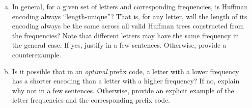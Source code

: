 \documentclass[11pt]{article}
\begin{document}
    \begin{tcolorbox}[title={Problem 4 (Huffman Encoding, Short Answers, 15 points)}] \setlength\parindent{1em}
        \begin{enumerate}[(a)]
        \item In general, for a given set of letters and corresponding frequencies, is Huffman encoding always ``length-unique''? That is, for any letter, will the length of its encoding always be the same across all valid Huffman trees constructed from the frequencies? Note that different letters may have the same frequency in the general case. If yes, justify in a few sentences. Otherwise, provide a counterexample.
        \item Is it possible that in an \emph{optimal} prefix code, a letter with a lower frequency has a shorter encoding than a
        letter with a higher frequency? If no, explain why not in a few sentences. Otherwise, provide an explicit example of the letter frequencies and the corresponding prefix code.
        \end{enumerate}    
    \end{tcolorbox}
    
\end{document}
